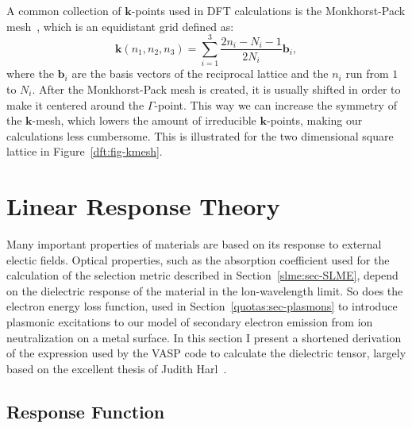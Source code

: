 \begin{refsection}
A common collection of $\mathbf{k}$-points used in DFT calculations is the 
Monkhorst-Pack mesh~\cite{Monkhorst1976}, which is an equidistant grid defined 
as: 
\begin{equation} 
\mathbf{k}(n_1,n_2,n_3) = \sum_{i=1}^{3} \frac{2n_i - N_i - 1}{2N_i} 
\mathbf{b}_i, 
\end{equation} 
where the $\mathbf{b}_i$ are the basis vectors of the reciprocal lattice and the $n_i$ run 
from $1$ to $N_i$. After the Monkhorst-Pack mesh is created, it is usually 
shifted in order to make it centered around the $\Gamma$-point. This way we 
can increase the symmetry of the $\mathbf{k}$-mesh, which lowers the amount of 
irreducible $\mathbf{k}$-points, making our calculations less cumbersome. This 
is illustrated for the two dimensional square lattice in 
Figure~\ref{dft:fig-kmesh}. 
 
\section{Linear Response Theory} \label{dft:sec-linear} 

Many important properties of materials are based on its response to external 
electic fields. Optical properties, such as the absorption coefficient used 
for the calculation of the selection metric described in 
Section~\ref{slme:sec-SLME}, depend on the dielectric response of the material 
in the lon-wavelength limit. So does the electron energy loss function, used in 
Section~\ref{quotas:sec-plasmons} to introduce plasmonic excitations to our 
model of secondary electron emission from ion neutralization on a metal 
surface. In this section I present a shortened derivation of the expression 
used by the VASP code to calculate the dielectric tensor, largely 
based on the excellent thesis of Judith Harl~\cite{Harl2008}.

\subsection{Response Function} 


\end{refsection}
